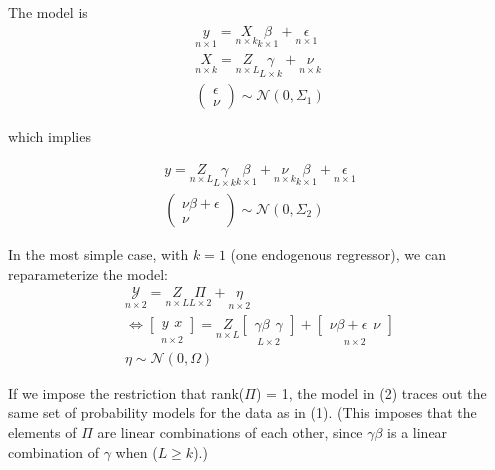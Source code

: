 \documentclass{article}
\begin{document}
The model is 
\begin{gather}
\underset{n \times 1}{y} = \underset{n\times k}{X}\underset{k\times1}{\beta} + \underset{n\times1}{\epsilon} \\
\underset{n \times k}{X} = \underset{n\times L}{Z}\underset{L\times k}{\gamma} + \underset{n\times k}{\nu} \nonumber \\
\begin{pmatrix} \epsilon \\ \nu \end{pmatrix} \sim \mathcal{N}(0, \Sigma_1)\nonumber
\end{gather}

which implies

\begin{gather*}
y = \underset{n\times L}{Z}\underset{L\times k}{\gamma}\underset{k\times 1}{\beta} + \underset{n\times k}{\nu}\underset{k \times 1}{\beta} + \underset{n\times1}{\epsilon} \\
\begin{pmatrix} \nu\beta + \epsilon \\ \nu \end{pmatrix} \sim \mathcal{N}(0, \Sigma_2)
\end{gather*}

In the most simple case, with $k=1$ (one endogenous regressor), we can reparameterize the model:
\begin{gather}
\underset{n \times 2}{\mathcal{Y}} = \underset{n\times L}{Z}\underset{L \times 2}{\Pi} + \underset{n\times2}{\eta} \\
\iff \underset{n \times 2}{\begin{bmatrix} y \hspace{5pt}  x \end{bmatrix}} =  \underset{n\times L}{Z}\underset{L \times 2}{\begin{bmatrix}\gamma\beta \hspace{5pt} \gamma\end{bmatrix}} + \underset{n\times2}{\begin{bmatrix}\nu\beta + \epsilon \hspace{5pt} \nu\end{bmatrix}} \nonumber \\
\eta \sim \mathcal{N}(0, \Omega)
\end{gather}

If we impose the restriction that rank($\Pi$) = 1, the model in (2) traces out the same set of probability models for the data as in (1).  (This imposes that the elements of $\Pi$ are linear combinations of each other, since $\gamma\beta$ is a linear combination of $\gamma$ when ($L\geq k$).)
\end{document}
